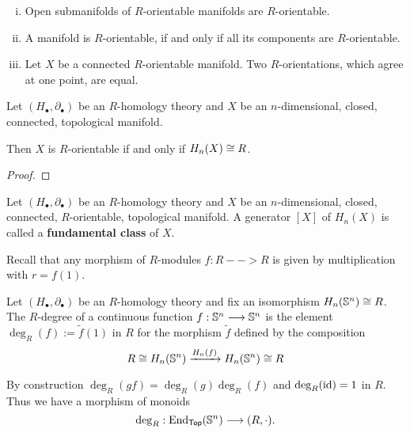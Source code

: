 	\begin{lemma}\vspace{-1.5em}
		\begin{enumerate}[(i)]
			\item{
				Open submanifolds of $R$-orientable manifolds are $R$-orientable.
			}
			\item{
				A manifold is $R$-orientable, if and only if all its components are $R$-orientable.
			}
			\item{
				Let $X$ be a connected $R$-orientable manifold. Two $R$-orientations, which agree at one point, are equal.
			}
		\end{enumerate}
	\end{lemma}

	\begin{proposition}
		Let $(H_\bullet, \partial_\bullet)$ be an $R$-homology theory and $X$ be an $n$-dimensional, closed, connected, topological manifold. 

		Then $X$ is $R$-orientable if and only if $H_n(X) \isom R$.
	\end{proposition}
	\begin{proof}
	\end{proof}

	\begin{definition}
		Let $(H_\bullet, \partial_\bullet)$ be an $R$-homology theory and $X$ be an $n$-dimensional, closed, connected, $R$-orientable, topological manifold. A generator $[X]$ of $H_n(X)$ is called a \textbf{fundamental class} of $X$.
	\end{definition}

	Recall that any morphism of $R$-modules $f:R --> R$ is given by multiplication with $r = f(1)$.

	\begin{definition}
		Let $(H_\bullet,\partial_\bullet)$ be an $R$-homology theory and fix an isomorphism $H_n(\S^n) \isom R$. The $R$-degree of a continuous function $f:\S^n --> \S^n$ is the element $\deg_R(f) := \tilde{f}(1)$ in $R$ for the morphism $\tilde f$ defined by the composition
		\begin{equation*}
			R \isom H_n(\S^n) \xrightarrow{H_n(f)} H_n(\S^n)\isom R
		\end{equation*}
	\end{definition}

	\begin{remark}
		By construction $\deg_R(gf) = \deg_R(g)\deg_R(f)$ and $\deg_R(\id) = 1$ in $R$. Thus we have a morphism of monoids
		\begin{equation*}
			\deg_R: \End_\ncat{Top}(\S^n) \longrightarrow (R,\cdot).
		\end{equation*}
	\end{remark}


